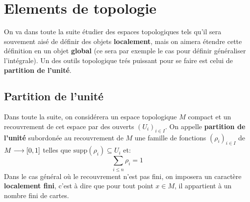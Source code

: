 \chapter{Elements de topologie}
On va dans toute la suite étudier des espaces topologiques tels qu'il sera souvement aisé de définir des objets \textbf{localement}, mais on aimera étendre cette définition en un objet \textbf{global} (ce sera par exemple le cas pour définir généraliser l'intégrale). Un des outils topologique trés puissant pour se faire est celui de \textbf{partition de l'unité}.

\section{Partition de l'unité}
Dans toute la suite, on considérera un espace topologique \( M \) compact et un recouvrement de cet espace par des ouverts \((U_i)_{i \in I}\). On appelle \textbf{partition de l'unité} subordonée au recouvrement de \( M \) une famille de fonctions \( (\rho_i)_{i \in I} \) de \( M \longrightarrow \icc{0}{1} \) telles que \( \text{supp}( \rho_i) \subseteq U_i \) et:
\[ 
   \sum_{i \leq n} \rho_i = 1
\]
Dans le cas général où le recouvrement n'est pas fini, on imposera un caractère \textbf{localement fini}, c'est à dire que pour tout point \( x \in M\), il appartient à un nombre fini de cartes.
